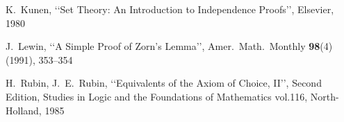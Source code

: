 \documentclass{article}
\begin{document}
\begin{thebibliography}{9}

    K.~Kunen,
    \lq\lq Set Theory: An Introduction to Independence Proofs\rq\rq,
    Elsevier, 1980

    J.~Lewin,
    \lq\lq A Simple Proof of Zorn's Lemma\rq\rq,
    Amer.\ Math.\ Monthly \textbf{98}(4) (1991),
    353--354

    H.~Rubin, J.~E.~Rubin, 
    \lq\lq Equivalents of the Axiom of Choice, II\rq\rq, Second Edition, 
    Studies in Logic and the Foundations of Mathematics vol.116, North-Holland, 1985

\end{thebibliography}
\end{document}
